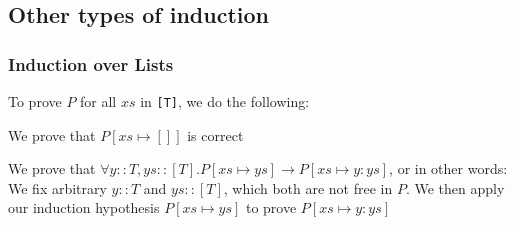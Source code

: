 \subsection{Other types of induction}
\subsubsection{Induction over Lists}
To prove $P$ for all $xs$ in \texttt{[T]}, we do the following:

 We prove that $P[xs \mapsto []]$ is correct

 We prove that $\forall y :: T, ys :: [T]. P[xs \mapsto ys] \rightarrow P[xs \mapsto y : ys]$, or in other words:
We fix arbitrary $y :: T$ and $ys :: [T]$, which both are not free in $P$.
We then apply our induction hypothesis $P[xs \mapsto ys]$ to prove $P[xs \mapsto y : ys]$
